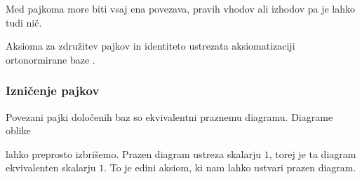 \documentclass[mat1]{fmfdelo}
\begin{document}
Med pajkoma more biti vsaj ena povezava, pravih vhodov ali izhodov pa je lahko tudi nič.

Aksioma za združitev pajkov in identiteto ustrezata aksiomatizaciji ortonormirane baze \cite[poglavje 5]{coecke_pavlovic_vicary_2013}.

\subsubsection{Izničenje pajkov} \label{iznicenje}
Povezani pajki določenih baz so ekvivalentni praznemu diagramu. Diagrame oblike
\begin{center}
\end{center}
lahko preprosto izbrišemo. Prazen diagram ustreza skalarju \(1\), torej je ta diagram ekvivalenten skalarju \(1\). To je edini aksiom, ki nam lahko ustvari prazen diagram.
%
%
\end{document}

